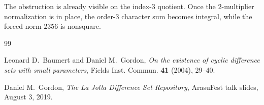 \documentclass[11pt]{amsart}
\begin{document}
\begin{remark}
The obstruction is already visible on the index-$3$ quotient.
Once the $2$-multiplier normalization is in place, the order-$3$ character sum becomes integral, while the forced norm $2356$ is nonsquare.
\end{remark}

\begin{thebibliography}{99}

Leonard D.~Baumert and Daniel M.~Gordon,
\emph{On the existence of cyclic difference sets with small parameters},
Fields Inst. Commun. \textbf{41} (2004), 29--40.

Daniel M.~Gordon,
\emph{The La Jolla Difference Set Repository},
ArasuFest talk slides, August 3, 2019.

\end{thebibliography}
\end{document}
